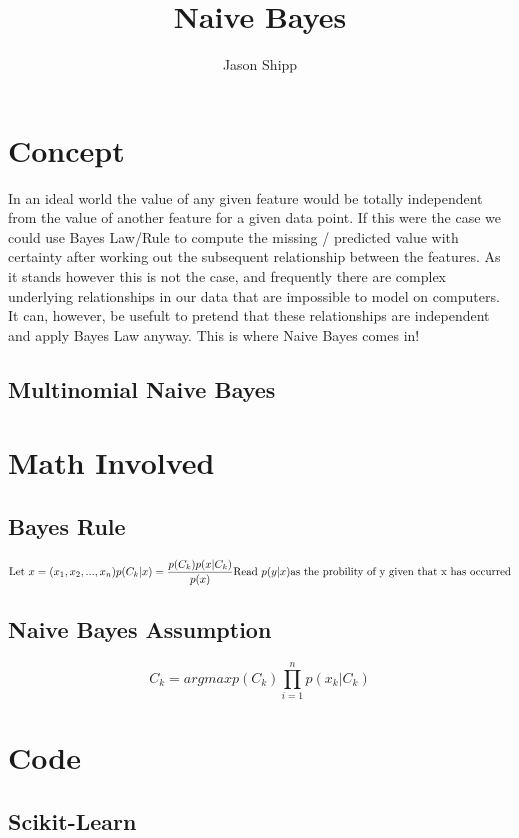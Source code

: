\documentclass{article}
\begin{document}
\title{Naive Bayes}
\author{Jason Shipp}
\maketitle

\section*{Concept}
In an ideal world the value of any given feature would be totally independent
from the value of another feature for a given data point. If this were the case
we could use Bayes Law/Rule to compute the missing / predicted value with
certainty after working out the subsequent relationship between the features. As
it stands however this is not the case, and frequently there are complex
underlying relationships in our data that are impossible to model on computers.
It can, however, be usefult to pretend that these relationships are independent
and apply Bayes Law anyway. This is where Naive Bayes comes in! 

\subsection*{Multinomial Naive Bayes}


\section*{Math Involved}

\subsection*{Bayes Rule} 
\begin{equation}
  \text{Let } x = (x_1, x_2, ..., x_n) \\
  p(C_k | x) = \frac{p(C_k)p(x | C_k)}{p(x)}\\
  \text{Read } p(y|x) \text{as the probility of y given that x has occurred}
\end{equation}

\subsection*{Naive Bayes Assumption}
\begin{equation}
  C_k = argmax p(C_k)\prod_{i=1}^{n}p(x_k | C_k)
\end{equation}

\section*{Code}
\subsection*{Scikit-Learn}
 
\end{document}

